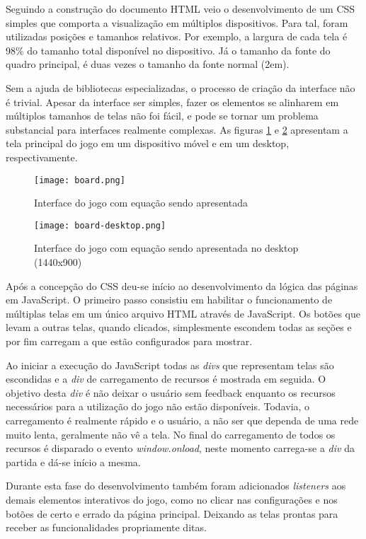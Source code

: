 Seguindo a construção do documento HTML veio o desenvolvimento de um
CSS simples que comporta a visualização em múltiplos dispositivos.
Para tal, foram utilizadas posições e tamanhos relativos. Por
exemplo, a largura de cada tela é 98\% do tamanho total disponível no
dispositivo. Já o tamanho da fonte do quadro principal, é duas vezes o
tamanho da fonte normal (2em).

Sem a ajuda de bibliotecas especializadas, o processo de criação da
interface não é trivial. Apesar da interface ser simples, fazer os elementos
se alinharem em múltiplos tamanhos de telas não foi fácil, e pode se
tornar um problema substancial para interfaces realmente complexas.
As figuras \ref{fig:gameScreen} e \ref{fig:gameScreenDesktop} apresentam
a tela principal do jogo em um dispositivo móvel e em um desktop, respectivamente.

\begin{figure}[H]
    \centering
    \texttt{[image: board.png]}
	\caption{Interface do jogo com equação sendo apresentada}
    \label{fig:gameScreen}
\end{figure}


\begin{figure}[H]
    \centering
    \texttt{[image: board-desktop.png]}
    \caption{Interface do jogo com equação sendo apresentada no desktop (1440x900)}
    \label{fig:gameScreenDesktop}
\end{figure}

Após a concepção do CSS deu-se início ao desenvolvimento da lógica
das páginas em JavaScript. O primeiro passo consistiu em habilitar o
funcionamento de múltiplas telas em um único arquivo HTML através
de JavaScript. Os botões que levam a outras telas, quando clicados,
simplesmente escondem todas as seções e por fim carregam a que estão
configurados para mostrar.

Ao iniciar a execução do JavaScript todas as \textit{divs} que
representam telas são escondidas e a \textit{div} de carregamento de
recursos é mostrada em seguida. O objetivo desta \textit{div} é não deixar
o usuário sem feedback enquanto os recursos necessários para a
utilização do jogo não estão disponíveis. Todavia, o carregamento
é realmente rápido e o usuário, a não ser que dependa de uma rede
muito lenta, geralmente não vê a tela. No final do carregamento
de todos os recursos é disparado o evento \textit{window.onload},
neste momento carrega-se a \textit{div} da partida e dá-se início a mesma.

Durante esta fase do desenvolvimento também foram adicionados
\textit{listeners} aos demais elementos interativos do jogo, como no
clicar nas configurações e nos botões de certo e errado da página
principal. Deixando as telas prontas para receber as funcionalidades
propriamente ditas.

